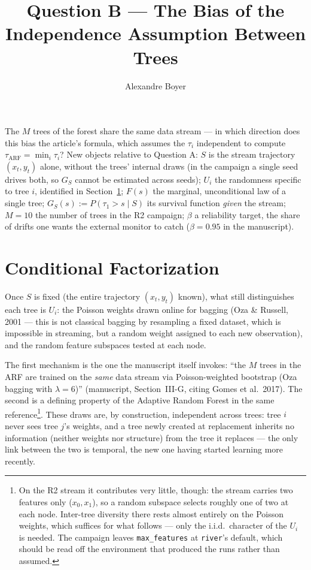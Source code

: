 \documentclass[11pt,a4paper]{article}
\title{Question B --- The Bias of the Independence Assumption Between Trees}
\author{Alexandre Boyer}
\date{}
\begin{document}
\maketitle

\noindent The $M$ trees of the forest share the same data stream --- in which
direction does this bias the article's formula, which assumes the $\tau_i$ independent
to compute $\tau_{\mathrm{ARF}} = \min_i \tau_i$? New objects relative to Question A:
$S$ is the stream trajectory $(x_t, y_t)$ alone, without the trees' internal draws (in the
campaign a single seed drives both, so $G_S$ cannot be estimated across seeds); $U_i$ the
randomness specific
to tree $i$, identified in Section~\ref{sec:factorization}; $F(s)$ the marginal,
unconditional law of a single tree; $G_S(s) := P(\tau_1>s\mid S)$ its survival function
\emph{given} the stream; $M=10$ the number of trees in the R2 campaign; $\beta$ a
reliability target, the share of drifts one wants the external monitor to catch
($\beta = 0.95$ in the manuscript).

\section{Conditional Factorization}
\label{sec:factorization}

Once $S$ is fixed (the entire trajectory $(x_t,y_t)$ known), what still distinguishes
each tree is $U_i$: the Poisson weights drawn online for bagging (Oza \& Russell, 2001
--- this is not classical bagging by resampling a fixed dataset, which is impossible in
streaming, but a random weight assigned to each new observation), and the random
feature subspaces tested at each node.

The first mechanism is the one the manuscript itself invokes: ``the $M$ trees in the ARF
are trained on the \emph{same} data stream via Poisson-weighted bootstrap (Oza bagging
with $\lambda = 6$)'' (manuscript, Section~III-G, citing Gomes et al.\ 2017). The second
is a defining property of the Adaptive Random Forest in the same
reference\footnote{On the R2 stream it contributes very little, though: the stream
carries two features only ($x_0, x_1$), so a random subspace selects roughly one of two
at each node. Inter-tree diversity there rests almost entirely on the Poisson weights,
which suffices for what follows --- only the i.i.d.\ character of the $U_i$ is needed.
The campaign leaves \texttt{max\_features} at \texttt{river}'s default, which should be
read off the environment that produced the runs rather than assumed.}. These draws are,
by construction, independent across trees: tree $i$ never sees tree $j$'s weights, and a tree newly created at
replacement inherits no information (neither weights nor structure) from the tree it
replaces --- the only link between the two is temporal, the new one having started
learning more recently.
\end{document}
